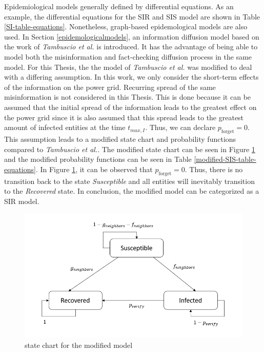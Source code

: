 
Epidemiological models generally defined by differential equations.
As an example, the differential equations for the SIR and SIS 
model are shown in Table \ref{SI-table-equations}.
Nonetheless, graph-based epidemological models are also used.
In Section \ref{epidemologicalmodels}, an information 
diffusion model based on the work of \textit{Tambuscio et al.} 
\cite{sirsmodel} is introduced. It has the advantage of being 
able to model both the misinformation and fact-checking 
diffusion process in the same model. 
For this Thesis, the the model of \textit{Tambuscio et al.} was
modified to deal with a differing assumption.
In this work, we only consider the short-term effects of the information 
on the power grid. Recurring spread of the same misinformation
is not considered in this Thesis. This is done because it can be 
assumed that the initial spread of the information leads to the 
greatest effect on the power grid since it is also assumed that this
spread leads to the greatest amount of infected entities at
the time $t_{max,I}$. Thus, we can declare $p_{\mathrm{forget}} = 0$.
This assumption leads to a modified state chart and probability
functions compared to \textit{Tambuscio et al.}. The modified
state chart can be seen in Figure \ref{modifiedmodelstatechart}
and the modified probability functions can be seen in Table
\ref{modified-SIS-table-equations}. In Figure 
\ref{modifiedmodelstatechart}, it can be observed that 
$p_{\mathrm{forget}} = 0$. Thus, there is no transition back to 
the state \textit{Susceptible} and all entities
will inevitably transition to the \textit{Recovered} state. 
In conclusion, the modified model can be categorized as a SIR model. 


\begin{figure}[!ht]
    \center
    \includegraphics[scale=.9]{figs/Tambuscio_modified.png}
    \caption{state chart for the modified model}
    \label{modifiedmodelstatechart}
\end{figure}

